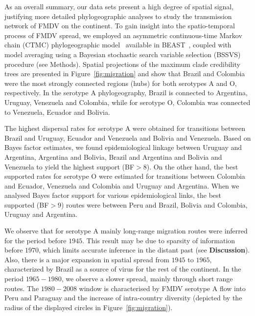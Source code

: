 \documentclass[10pt]{article}
\begin{document}
As an overall summary, our data sets present a high degree of spatial signal, justifying more detailed phylogeographic analyses to study the transmission network of FMDV on the continent.
To gain insight into the spatio-temporal process of FMDV spread, we employed an asymmetric continuous-time Markov chain (CTMC) phylogeographic model~\cite{roots} available in BEAST~\cite{beast2012}, coupled with model averaging using a Bayesian stochastic search variable selection (BSSVS) procedure (see Methods).
Spatial projections of the maximum clade credibility trees are presented in Figure~\ref{fig:migration} and show that Brazil and Colombia were the most strongly connected regions (hubs) for both serotypes A and O, respectively. 
In the serotype A phylogeography, Brazil is connected to Argentina, Uruguay, Venezuela and Colombia, while for serotype O, Colombia was connected to Venezuela, Ecuador and Bolivia.

The highest dispersal rates for serotype A were obtained for transitions between Brazil and Uruguay, Ecuador and Venezuela and Bolivia and Venezuela.
Based on Bayes factor estimates, we found epidemiological linkage between Uruguay and Argentina, Argentina and Bolivia, Brazil and Argentina and Bolivia and Venezuela to yield the highest support (BF$>8$).
On the other hand, the best supported rates for serotype O were estimated for transitions between Colombia and Ecuador, Venezuela and Colombia and Uruguay and Argentina.
When we analysed Bayes factor support for various epidemiological links, %
the best supported (BF$>9$) routes were between Peru and Brazil, Bolivia and Colombia, Uruguay and Argentina.

We observe that for serotype A mainly long-range migration routes were inferred for the period before $1945$.
This result may be due to sparsity of information before $1970$, which limits accurate inference in the distant past (see {\bf Discussion}). 
Also, there is a major expansion in spatial spread from $1945$ to $1965$, characterized by Brazil as a source of virus for the rest of the continent.
In the period $1965-1980$, we observe a slower spread, mainly through short range routes.
The $1980-2008$ window is characterised by FMDV serotype A flow into Peru and Paraguay and the increase of intra-country diversity (depicted by the radius of the displayed circles in Figure~\ref{fig:migration}).   
\end{document}
